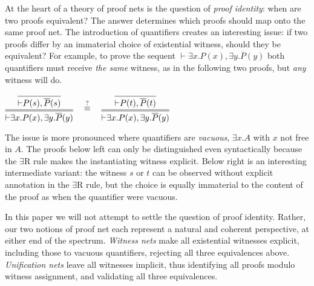 \documentclass[UKenglish]{lipics-v2019}
\makeatletter
\newcommand\+{+}
\renewcommand\*{\times}
\newcommand\dual[1]{\overline{#1}}
\newcommand\seq[2]{{\vdash}#1,#2}
\newcommand\qrr[1]{
  \ifx#1+\expandafter\@qrr\else
  \ifx#1*\*\mathrm R\else
  \ifx#1!\forall\mathrm R\else
  \ifx#1?\expandafter\@@qrr\else
  \ifx#11\mathrm{ax}\else
  \ifx#1.\mathrm{cut}\else
  #1\mathrm R
  \fi\fi\fi\fi\fi\fi
}
\newcommand\@qrr[1]{+\mathrm R,#1}
\newcommand\@@qrr[1]{\exists\mathrm R,#1}
\makeatother
\begin{document}
At the heart of a theory of proof nets is the question of \emph{proof identity}: when are two proofs equivalent? The answer determines which proofs should map onto the same proof net. The introduction of quantifiers creates an interesting issue: if two proofs differ by an immaterial choice of existential witness, should they be equivalent? For example, to prove the sequent $\seq{\exists x.P(x)}{\exists y.\dual P(y)}$ both quantifiers must receive \emph{the same} witness, as in the following two proofs, but \emph{any} witness will do.
\begin{center}\(
	\vc{\infer={\seq{\exists x.P(x)}{\exists y.\dual P(y)}}{\infer{\seq{P(s)}{\dual P(s)}}{}}}
	\quad
	\stackrel?\equiv
	\quad
	\vc{\infer={\seq{\exists x.P(x)}{\exists y.\dual P(y)}}{\infer{\seq{P(t)}{\dual P(t)}}{}}}
\)\end{center}
The issue is more pronounced where quantifiers are \emph{vacuous}, $\exists x.A$ with $x$ not free in $A$. The proofs below left can only be distinguished even syntactically because the $\exists\mathrm R$ rule makes the instantiating witness explicit. Below right is an interesting intermediate variant: the witness $s$ or $t$ can be observed without explicit annotation in the $\exists\mathrm R$ rule, but the choice is equally immaterial to the content of the proof as when the quantifier were vacuous.
In this paper we will not attempt to settle the question of proof identity. Rather, our two notions of proof net each represent a natural and coherent perspective, at either end of the spectrum. \emph{Witness nets} make all existential witnesses explicit, including those to vacuous quantifiers, rejecting all three equivalences above. \emph{Unification nets} leave all witnesses implicit, thus identifying all proofs modulo witness assignment, and validating all three equivalences.
\end{document}
